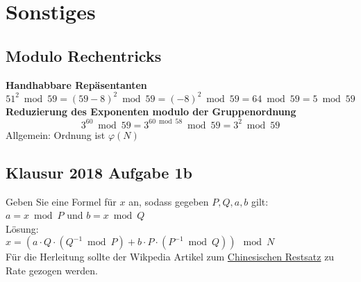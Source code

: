 \section{Sonstiges}%
\label{snst:sec:sonstiges}

\subsection{Modulo Rechentricks}%
\label{snst:sub:modulo}
\textbf{Handhabbare Repäsentanten}
\[51^2 \bmod 59 = (59-8)^2 \bmod 59 = (-8)^2 \bmod 59 = 64 \bmod 59 = 5 \bmod 59\]
\textbf{Reduzierung des Exponenten modulo der Gruppenordnung}
\[3^{60} \bmod 59 = 3^{60 \bmod 58} \bmod 59 = 3^2 \bmod 59\]
Allgemein: Ordnung ist \(\varphi(N)\)

\subsection{Klausur 2018 Aufgabe 1b}%
\label{snst:sub:klausur}
Geben Sie eine Formel für \(x\) an, sodass gegeben \(P, Q, a, b\) gilt:\\
\(a = x \bmod P\) und \(b = x \bmod Q\)\\
Lösung:\\
\(x = ( a \cdot Q  \cdot (Q^{-1} \bmod P) + b \cdot P \cdot (P^{-1} \bmod Q)) \mod N\)\\
Für die Herleitung sollte der Wikpedia Artikel zum
\href{https://de.wikipedia.org/wiki/Chinesischer_Restsatz}{Chinesischen Restsatz}
zu Rate gezogen werden.